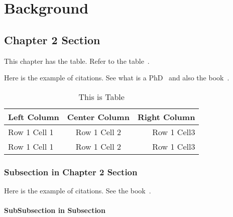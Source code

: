 
\chapter{Background}

\section{Chapter 2 Section}

This chapter has the table. Refer to the table~.

Here is the example of citations. See what is a PhD~\cite{Might2010} and also the book~\cite{Popper2002}.

\lipsum[1-5]

\begin{table}


\centering
\begin{tabular} {l c r}
\toprule
Left Column	& Center Column	& Right Column \\
\toprule

Row 1 Cell 1	& Row 1 Cell 2		& Row 1 Cell3 \\

Row 1 Cell 1	& Row 1 Cell 2		& Row 1 Cell3 \\

\bottomrule

\end{tabular}
\label{Table::firstTable}
\caption{This is Table}
\end{table}

\subsection{Subsection in Chapter 2 Section}
\lipsum[1-2]

Here is the example of citations. See the book~\cite{Popper2002}.

\subsubsection{SubSubsection in Subsection}
\lipsum[1-10]
